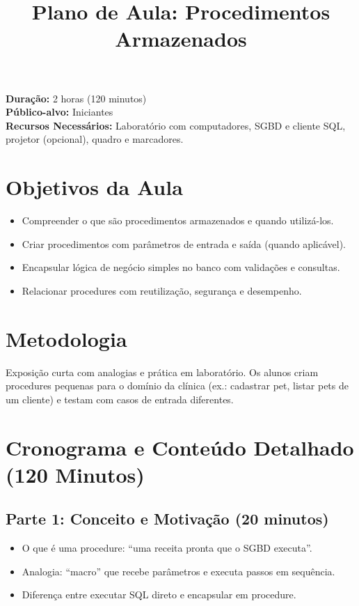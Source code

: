 \documentclass[12pt,a4paper]{article}
\title{Plano de Aula: Procedimentos Armazenados}
\date{}
\begin{document}
\maketitle

\noindent
\textbf{Duração:} 2 horas (120 minutos)\\
\textbf{Público-alvo:} Iniciantes\\
\textbf{Recursos Necessários:} Laboratório com computadores, SGBD e cliente SQL, projetor (opcional), quadro e marcadores.

\section{Objetivos da Aula}
\begin{itemize}[leftmargin=*,itemsep=0.25em]
  \item Compreender o que são procedimentos armazenados e quando utilizá-los.
  \item Criar procedimentos com parâmetros de entrada e saída (quando aplicável).
  \item Encapsular lógica de negócio simples no banco com validações e consultas.
  \item Relacionar procedures com reutilização, segurança e desempenho.
\end{itemize}

\section{Metodologia}
Exposição curta com analogias e prática em laboratório. Os alunos criam procedures pequenas para o domínio da clínica (ex.: cadastrar pet, listar pets de um cliente) e testam com casos de entrada diferentes.

\section{Cronograma e Conteúdo Detalhado (120 Minutos)}
\subsection*{Parte 1: Conceito e Motivação (20 minutos)}
\begin{itemize}[leftmargin=*,itemsep=0.35em]
  \item O que é uma procedure: ``uma receita pronta que o SGBD executa''.
  \item Analogia: ``macro'' que recebe parâmetros e executa passos em sequência.
  \item Diferença entre executar SQL direto e encapsular em procedure.
\end{itemize}
\end{document}
